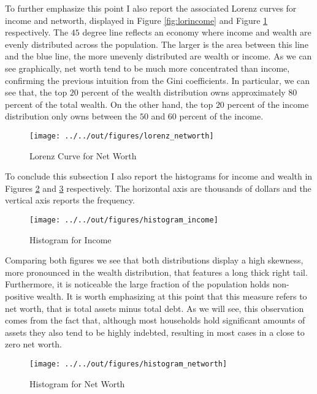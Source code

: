 \documentclass[11pt, a4paper, leqno]{article}
\begin{document}
To further emphasize this point I also report the associated Lorenz curves for income and networth, displayed in Figure \ref*{fig:lorincome} and Figure \ref*{fig:lornetworth} respectively. The $45$ degree line reflects an economy where income and wealth are evenly distributed across the population. The larger is the area between this line and the blue line, the more unevenly distributed are wealth or income. As we can see graphically, net worth tend to be much more concentrated than income, confirming the previous intuition from the Gini coefficients. In particular, we can see that, the top $20$ percent of the wealth distribution owns approximately $80$ percent of the total wealth. On the other hand, the top $20$ percent of the income distribution only owns between the $50$ and $60$ percent of the income. 


\begin{figure}[H]
    \caption{Lorenz Curve for Net Worth}
    
    \texttt{[image: ../../out/figures/lorenz\_networth]}
    \label{fig:lornetworth}

\end{figure}

To conclude this subsection I also report the histograms for income and wealth in Figures \ref*{fig:histincome} and \ref*{fig:histnetworth} respectively. The horizontal axis are thousands of dollars and the vertical axis reports the frequency. 

\begin{figure}[h]
    \caption{Histogram for Income}
    
    \texttt{[image: ../../out/figures/histogram\_income]}
    \label{fig:histincome}
\end{figure}

Comparing both figures we see that both distributions display a high skewness, more pronounced in the wealth distribution, that features a long thick right tail. Furthermore, it is noticeable the large fraction of the population holds non-positive wealth. It is worth emphasizing at this point that this measure refers to net worth, that is total assets minus total debt. As we will see, this observation comes from the fact that, although most households hold significant amounts of assets they also tend to be highly indebted, resulting in most cases in a close to zero net worth.

\begin{figure}[h]
    \caption{Histogram for Net Worth}
    
    \texttt{[image: ../../out/figures/histogram\_networth]}
    \label{fig:histnetworth}
\end{figure}
\end{document}

